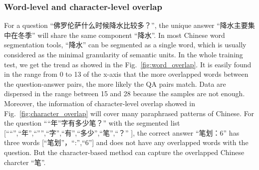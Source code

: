 \documentclass{llncs}
\begin{document}
\subsubsection{Word-level and character-level overlap}

For a question ``佛罗伦萨什么时候降水比较多？'', the unique answer ``降水主要集中在冬季'' will share the same component ``降水''. In most Chinese word segmentation tools, ``降水'' can be
segmented as a single word, which is usually considered as the minimal granularity of semantic units.
In the whole training test, we get the trend as showed in the Fig.~\ref{fig:word_overlap}. It is easily found in the range from 0 to 13 of the x-axis that the more overlapped words between the question-answer pairs, the more likely the QA pairs match. Data are dispersed in the range between 15 and 28 because the samples are not enough. Moreover, the information of character-level overlap showed  in Fig.~\ref{fig:character_overlap} will cover many paraphrased patterns of Chinese. For the question ``“年”字有多少笔？'' with the segmented list [``“'',``年'',``”'',``字'',``有'',``多少'',``笔'',``？'' ], the correct answer ``笔划：6'' has three words [``笔划''，``:'',``6''] and does not have any overlapped words with the question. But the character-based method can capture the overlapped Chinese charcter ``笔''.  
\end{document}
